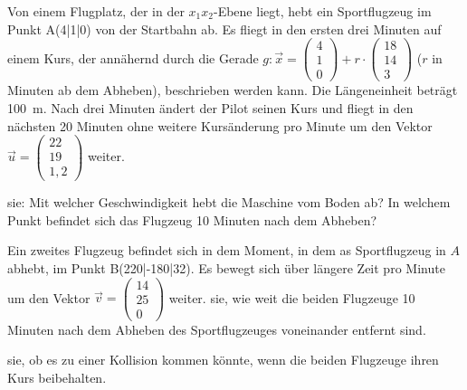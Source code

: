 \documentclass[11pt, a5paper, landscape]{scrartcl}
\begin{document}
	\begin{aufgabe}\small
		Von einem Flugplatz, der in der $x_1x_2$-Ebene liegt, hebt ein Sportflugzeug im Punkt A\pkt(4|1|0) von der Startbahn ab. Es fliegt in den ersten drei Minuten auf einem Kurs, der annähernd durch die Gerade $g: \vec{x} = \begin{pmatrix} 4 \\ 1 \\ 0 \end{pmatrix} + r\cdot \begin{pmatrix} 18 \\ 14 \\ 3 \end{pmatrix}$ ($r$ in Minuten ab dem Abheben), beschrieben werden kann. Die Längeneinheit beträgt \SI{100}{\meter}. Nach drei Minuten ändert der Pilot seinen Kurs und fliegt in den nächsten 20 Minuten ohne weitere Kursänderung pro Minute um den Vektor $\vec{u} = \begin{pmatrix} 22 \\ 19 \\ 1,2 \end{pmatrix}$ weiter.
		
		\begin{teilaufgaben}
			\teilaufgabe {} sie: Mit welcher Geschwindigkeit hebt die Maschine vom Boden ab? In welchem Punkt befindet sich das Flugzeug 10 Minuten nach dem Abheben?
			
			\teilaufgabe Ein zweites Flugzeug befindet sich in dem Moment, in dem as Sportflugzeug in $A$ abhebt, im Punkt B\pkt(220|-180|32). Es bewegt sich über längere Zeit pro Minute um den Vektor $\vec{v} = \begin{pmatrix} 14 \\ 25 \\ 0 \end{pmatrix}$ weiter.  sie, wie weit die beiden Flugzeuge 10 Minuten nach dem Abheben des Sportflugzeuges voneinander entfernt sind.
			
			\teilaufgabe {} sie, ob es zu einer Kollision kommen könnte, wenn die beiden Flugzeuge ihren Kurs beibehalten.
		\end{teilaufgaben}
	\end{aufgabe}
	\clearpage
	
\end{document}
